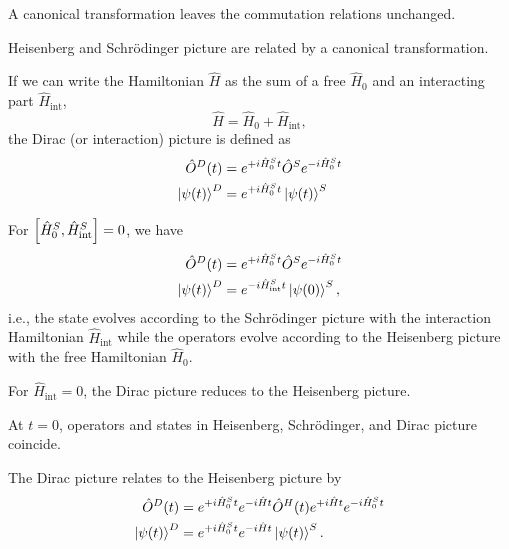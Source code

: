 \begin{definition}
	A canonical transformation leaves the commutation relations unchanged.	
\end{definition}
\begin{lemma}\label{thm:heisenberg_schroedinger_canonical_transformation}
	Heisenberg and Schrödinger picture are related by a canonical transformation.
\end{lemma}
\begin{definition}
	If we can write the Hamiltonian $\hat{H}$ as the sum of a free $\hat{H}_0$ and an interacting part $\hat{H}_\text{int}$,
	\begin{equation}
		\hat{H}
		=
		\hat{H}_0
		+
		\hat{H}_\text{int}
		,
	\end{equation}
	the Dirac (or interaction) picture is defined as
	\begin{align}
		\hat{O}^D(t)
		&=
		e^{+i\hat{H}_0^St}
		\hat{O}^S
		e^{-i\hat{H}_0^St}
		\\
		\ket{\psi(t)}^D
		&=
		e^{+i\hat{H}_0^St}
		\ket{\psi(t)}^S
	\end{align}
\end{definition}
\begin{remark}
	For $\comm{\hat{H}_0^S}{\hat{H}_\text{int}^S}=0$, we have
	\begin{align}
		\hat{O}^D(t)
		&=
		e^{+i\hat{H}_0^St}
		\hat{O}^S
		e^{-i\hat{H}_0^St}
		\\
		\ket{\psi(t)}^D
		&=
		e^{-i\hat{H}_\text{int}^St}
		\ket{\psi(0)}^S
		,
	\end{align}
	i.e., the state evolves according to the Schrödinger picture with the interaction Hamiltonian $\hat{H}_\text{int}$ while the operators evolve according to the Heisenberg picture with the free Hamiltonian $\hat{H}_0$.
\end{remark}
\begin{corollary}
	For $\hat{H}_\text{int}=0$, the Dirac picture reduces to the Heisenberg picture.
\end{corollary}
\begin{corollary}
	At $t=0$, operators and states in Heisenberg, Schrödinger, and Dirac picture coincide.
\end{corollary}
\begin{lemma}
	The Dirac picture relates to the Heisenberg picture by
	\begin{align}
		\hat{O}^D(t)
		&=
		e^{+i\hat{H}_0^St}
		e^{-i\hat{H}t}
		\hat{O}^H(t)
		e^{+i\hat{H}t}
		e^{-i\hat{H}_0^St}
		\\
		\ket{\psi(t)}^D
		&=
		e^{+i\hat{H}_0^St}
		e^{-i\hat{H}t}
		\ket{\psi(t)}^S
		.
	\end{align}
\end{lemma}

